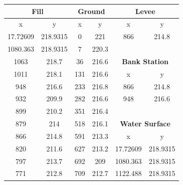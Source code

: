 \begin{center}
\begin{tabular}{|cc||cc||cc|} 
    \hline
    \multicolumn{2}{|c||}{\textbf{Fill}} & \multicolumn{2}{c||}{\textbf{Ground}} & \multicolumn{2}{c|}{\textbf{Levee}}            \\ 
    \hline
    x        & y                        & x    & y                             & x        & y                                   \\
    17.72609 & 218.9315                 & 0    & 221                           & 866      & 214.8                               \\
    1080.363 & 218.9315                 & 7    & 220.3                         &          &                                     \\
    1063     & 218.7                    & 36   & 216.6                         & \multicolumn{2}{c|}{\textbf{Bank Station}}     \\ 
    \cline{5-6}
    1011     & 218.1                    & 131  & 216.6                         & x        & y                                   \\
    948      & 216.6                    & 233  & 216.8                         & 866      & 214.8                               \\
    932      & 209.9                    & 282  & 216.6                         & 948      & 216.6                               \\
    899      & 210.2                    & 351  & 216.4                         &          &                                     \\
    879      & 214                      & 518  & 216.1                         & \multicolumn{2}{c|}{\textbf{Water Surface}}    \\ 
    \cline{5-6}
    866      & 214.8                    & 591  & 213.3                         & x        & y                                   \\
    820      & 211.6                    & 627  & 213.2                         & 17.72609 & 218.9315                            \\
    797      & 213.7                    & 692  & 209                           & 1080.363 & 218.9315                            \\
    771      & 212.8                    & 709  & 212.7                         & 1122.488 & 218.9315                            \\

\end{tabular}
\end{center}

